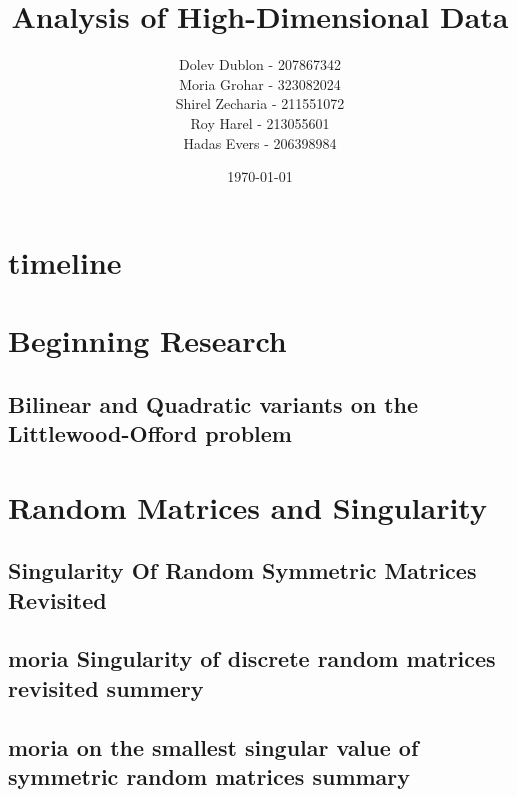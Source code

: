 \documentclass[12pt]{article}
\title{\textbf{Analysis of High-Dimensional Data}}
\author{
    Dolev Dublon - 207867342\\
    Moria Grohar - 323082024\\ 
    Shirel Zecharia - 211551072\\
    Roy Harel - 213055601\\
    Hadas Evers - 206398984 
}
\date{\today}
\begin{document}
\maketitle


\tableofcontents

\newpage





\section{timeline}



\section{Beginning Research}
\subsection{Bilinear and Quadratic variants on the Littlewood-Offord problem}



\section{Random Matrices and Singularity}





\subsection{Singularity Of Random Symmetric Matrices Revisited}



\subsection{moria Singularity of discrete random matrices revisited summery}



\subsection{moria on the smallest singular value of symmetric random matrices summary}
\end{document}
